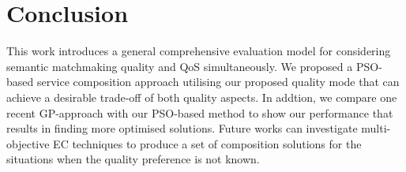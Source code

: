 \documentclass{llncs}
\begin{document}
\section{Conclusion}\label{conclusion}
This work introduces a general comprehensive evaluation model for considering semantic matchmaking quality and QoS simultaneously. We proposed a PSO-based service composition approach utilising our proposed quality mode that can achieve a desirable trade-off of both quality aspects. In addtion, we compare one recent GP-approach with our PSO-based method to show our performance that results in finding more optimised solutions. Future works can investigate multi-objective EC techniques to produce a set of composition solutions for the situations when the quality preference is not known.




\end{document}
